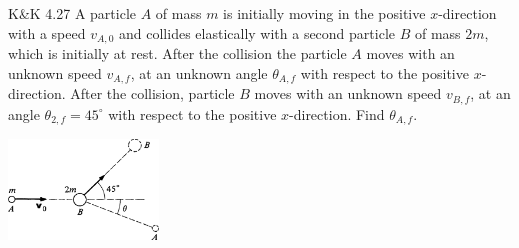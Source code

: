 \documentclass{esg8012pset}
\begin{document}
\begin{problem}{K\&K 4.27}
  A particle $A$ of mass $m$ is initially moving in the positive $x$-direction with a speed $v_{A,0}$ and collides elastically with a second particle $B$ of mass $2m$, which is initially at rest.  After the collision the particle $A$ moves with an unknown speed $v_{A,f}$, at an unknown angle $\theta_{A, f}$ with respect to the positive $x$-direction. After the collision, particle $B$ moves with an unknown speed $v_{B, f}$, at an angle $\theta_{2,f} = 45^{\circ}$ with respect to the positive $x$-direction.  Find $\theta_{A, f}$.
  \begin{center}\includegraphics[width=0.3\textwidth]{ps07_3}\end{center}
\end{problem}
\end{document}
